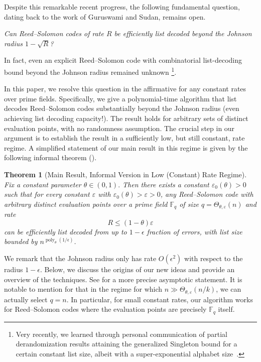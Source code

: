 \documentclass[11pt]{article}
\newtheorem{theorem}{Theorem}[section]
\newcommand{\F}{\mathbb F}
\newcommand{\eps}{\varepsilon}
\let \cref \Cref
\begin{document}
Despite this remarkable recent progress, the following fundamental question, dating back to the work of Guruswami and Sudan, remains open.
\begin{center}
{\centering
\itshape
Can Reed--Solomon codes of rate $R$ be efficiently list decoded
beyond the Johnson radius $1-\sqrt{R}$?
}
\end{center}
In fact, even an explicit Reed--Solomon code with combinatorial list-decoding bound beyond the Johnson radius remained unknown \footnote{Very recently, we learned through personal communication of partial derandomization results attaining the generalized Singleton bound for a certain constant list size, albeit with a super-exponential alphabet size~\cite{ChatterjeeEtAl2026ExplicitRS}.}.

In this paper, we resolve this question in the affirmative for any constant rates over prime fields. Specifically, we give a polynomial-time algorithm that list decodes Reed--Solomon codes substantially beyond the Johnson radius (even achieving list decoding capacity!). The result holds for arbitrary sets of distinct evaluation points, with no randomness assumption. 
The crucial step in our argument is to establish the result in a sufficiently low, but still constant, rate regime. A simplified statement of our main result in this regime is given by the following informal theorem ().
\begin{theorem}[Main Result, Informal Version in Low (Constant) Rate Regime]\label{thm:main}
Fix a constant parameter $\theta\in(0,1).$ Then there exists a constant $\eps_0(\theta)>0$ such that for every constant $\eps$ with $\eps_0(\theta)>\eps>0$, any Reed--Solomon code
with arbitrary distinct evaluation points over a prime field
$\mathbb{F}_q$ of size $q=\Theta_{\theta,\eps}(n)$ and rate
\[
R\leq(1-\theta)\eps
\]
can be efficiently list decoded from up to $1-\epsilon$ fraction of errors,
with list size bounded by $n^{\operatorname{poly}_{\theta}(1/\epsilon)}$.
\end{theorem}

We remark that the Johnson radius only has rate $O(\epsilon^2)$ with respect to the radius $1-\epsilon$. Below, we discuss the origins of our new ideas and provide an overview of the techniques. See \cref{thm:main-formal} for a more precise asymptotic statement. It is notable to mention for \cref{thm:main} that in the regime for which $n \gg \Theta_{\theta,\eps}(n/k)$, we can actually select $q = n$. In particular, for small constant rates, our algorithm works for Reed--Solomon codes where the evaluation points are precisely $\F_q$ itself.
\end{document}

